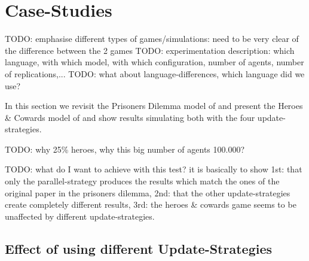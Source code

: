 \section{Case-Studies}
TODO: emphasise different types of games/simulations: need to be very clear of the difference between the 2 games
TODO: experimentation description: which language, with which model, with which configuration, number of agents, number of replications,...
TODO: what about language-differences, which language did we use?

In this section we revisit the Prisoners Dilemma model of \cite{nowak_evolutionary_1992} and present the Heroes \& Cowards model of \cite{wilensky_introduction_2015} and show results simulating both with the four update-strategies. 

TODO: why 25\% heroes, why this big number of agents 100.000?

TODO: what do I want to achieve with this test? it is basically to show 1st: that only the parallel-strategy produces the results which match the ones of the original paper in the prisoners dilemma, 2nd: that the other update-strategies create completely different results, 3rd: the heroes \& cowards game seems to be unaffected by different update-strategies.

\subsection{Effect of using different Update-Strategies}

